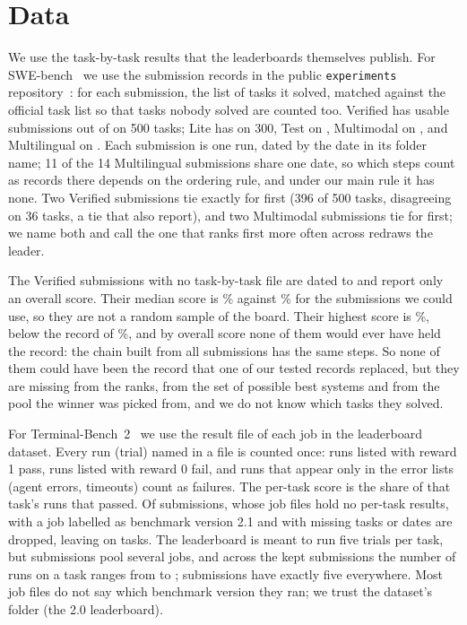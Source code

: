 \documentclass[11pt]{article}
\begin{document}
\section{Data}\label{sec:data}
We use the task-by-task results that the leaderboards themselves publish.
For SWE-bench~\citep{jimenez2024swebench,openai2024verified,yang2024swebenchmm,swebenchmultilingual} we use the submission records in the public \texttt{experiments} repository~\citep{swebenchexperiments}: for each submission, the list of tasks it solved, matched against the official task list so that tasks nobody solved are counted too.
Verified has \NumVerifiedK{} usable submissions out of \NumMissingFound{} on 500 tasks; Lite has \NumLiteK{} on 300, Test \NumTestK{} on \NumTestT{}, Multimodal \NumMultimodalK{} on \NumMultimodalT{}, and Multilingual \NumMultilingualK{} on \NumMultilingualT{}.
Each submission is one run, dated by the date in its folder name; 11 of the 14 Multilingual submissions share one date, so which steps count as records there depends on the ordering rule, and under our main rule it has none.
Two Verified submissions tie exactly for first (396 of 500 tasks, disagreeing on 36 tasks, a tie that \citet{liu2026converged} also report), and two Multimodal submissions tie for first; we name both and call the one that ranks first more often across redraws the leader.

The \NumMissingN{} Verified submissions with no task-by-task file are dated \NumMissingFrom{} to \NumMissingTo{} and report only an overall score.
Their median score is \NumMissingMedian\% against \NumIncludedMedian\% for the submissions we could use, so they are not a random sample of the board.
Their highest score is \NumMissingMax\%, below the record of \NumIncludedMax\%, and by overall score none of them would ever have held the record: the chain built from all \NumMissingFound{} submissions has the same \NumVerifiedSteps{} steps.
So none of them could have been the record that one of our tested records replaced, but they are missing from the ranks, from the set of possible best systems and from the pool the winner was picked from, and we do not know which tasks they solved.

For Terminal-Bench~2~\citep{merrill2026terminalbench,terminalbench2026} we use the result file of each job in the leaderboard dataset.
Every run (trial) named in a file is counted once: runs listed with reward 1 pass, runs listed with reward 0 fail, and runs that appear only in the error lists (agent errors, timeouts) count as failures.
The per-task score is the share of that task's runs that passed.
Of \NumTBFound{} submissions, \NumTBDroppedNoResults{} whose job files hold no per-task results, \NumTBDroppedVersion{} with a job labelled as benchmark version 2.1 and \NumTBDroppedMissing{} with missing tasks or dates are dropped, leaving \NumTBK{} on \NumTBTasks{} tasks.
The leaderboard is meant to run five trials per task, but \NumTBPooled{} submissions pool several jobs, and across the kept submissions the number of runs on a task ranges from \NumTBTrialsMin{} to \NumTBTrialsMax{}; \NumTBExactlyFive{} submissions have exactly five everywhere.
Most job files do not say which benchmark version they ran; we trust the dataset's folder (the 2.0 leaderboard).
\end{document}
